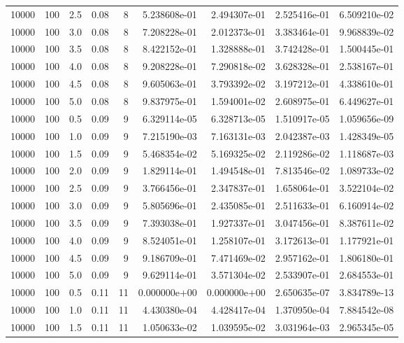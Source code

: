 \begin{tabular}{rrrrrrrrr}
 10000 &  100 &  2.5 &  0.08 &     8 &  5.238608e-01 &  2.494307e-01 &  2.525416e-01 &  6.509210e-02 \\
 10000 &  100 &  3.0 &  0.08 &     8 &  7.208228e-01 &  2.012373e-01 &  3.383464e-01 &  9.968839e-02 \\
 10000 &  100 &  3.5 &  0.08 &     8 &  8.422152e-01 &  1.328888e-01 &  3.742428e-01 &  1.500445e-01 \\
 10000 &  100 &  4.0 &  0.08 &     8 &  9.208228e-01 &  7.290818e-02 &  3.628328e-01 &  2.538167e-01 \\
 10000 &  100 &  4.5 &  0.08 &     8 &  9.605063e-01 &  3.793392e-02 &  3.197212e-01 &  4.338610e-01 \\
 10000 &  100 &  5.0 &  0.08 &     8 &  9.837975e-01 &  1.594001e-02 &  2.608975e-01 &  6.449627e-01 \\
 10000 &  100 &  0.5 &  0.09 &     9 &  6.329114e-05 &  6.328713e-05 &  1.510917e-05 &  1.059656e-09 \\
 10000 &  100 &  1.0 &  0.09 &     9 &  7.215190e-03 &  7.163131e-03 &  2.042387e-03 &  1.428349e-05 \\
 10000 &  100 &  1.5 &  0.09 &     9 &  5.468354e-02 &  5.169325e-02 &  2.119286e-02 &  1.118687e-03 \\
 10000 &  100 &  2.0 &  0.09 &     9 &  1.829114e-01 &  1.494548e-01 &  7.813546e-02 &  1.089733e-02 \\
 10000 &  100 &  2.5 &  0.09 &     9 &  3.766456e-01 &  2.347837e-01 &  1.658064e-01 &  3.522104e-02 \\
 10000 &  100 &  3.0 &  0.09 &     9 &  5.805696e-01 &  2.435085e-01 &  2.511633e-01 &  6.160914e-02 \\
 10000 &  100 &  3.5 &  0.09 &     9 &  7.393038e-01 &  1.927337e-01 &  3.047456e-01 &  8.387611e-02 \\
 10000 &  100 &  4.0 &  0.09 &     9 &  8.524051e-01 &  1.258107e-01 &  3.172613e-01 &  1.177921e-01 \\
 10000 &  100 &  4.5 &  0.09 &     9 &  9.186709e-01 &  7.471469e-02 &  2.957162e-01 &  1.806180e-01 \\
 10000 &  100 &  5.0 &  0.09 &     9 &  9.629114e-01 &  3.571304e-02 &  2.533907e-01 &  2.684553e-01 \\
 10000 &  100 &  0.5 &  0.11 &    11 &  0.000000e+00 &  0.000000e+00 &  2.650635e-07 &  3.834789e-13 \\
 10000 &  100 &  1.0 &  0.11 &    11 &  4.430380e-04 &  4.428417e-04 &  1.370950e-04 &  7.884542e-08 \\
 10000 &  100 &  1.5 &  0.11 &    11 &  1.050633e-02 &  1.039595e-02 &  3.031964e-03 &  2.965345e-05 \\

\end{tabular}
